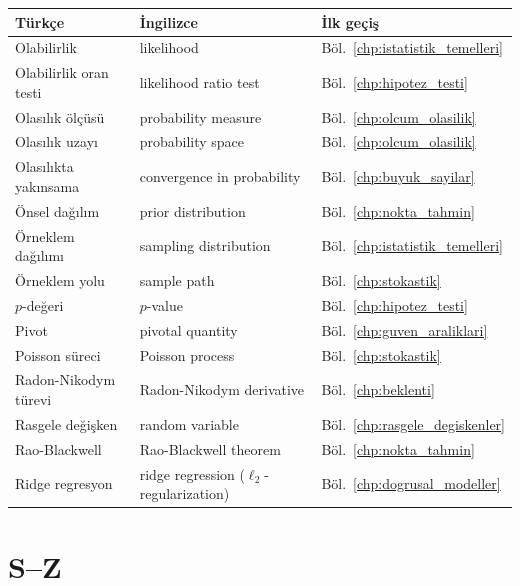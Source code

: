 \begin{tabular}{p{5cm}p{5cm}p{4cm}}
\hline
\textbf{Türkçe} & \textbf{İngilizce} & \textbf{İlk geçiş} \\
\hline
Olabilirlik & likelihood & Böl.~\ref{chp:istatistik_temelleri} \\
Olabilirlik oran testi & likelihood ratio test & Böl.~\ref{chp:hipotez_testi} \\
Olasılık ölçüsü & probability measure & Böl.~\ref{chp:olcum_olasilik} \\
Olasılık uzayı & probability space & Böl.~\ref{chp:olcum_olasilik} \\
Olasılıkta yakınsama & convergence in probability & Böl.~\ref{chp:buyuk_sayilar} \\
Önsel dağılım & prior distribution & Böl.~\ref{chp:nokta_tahmin} \\
Örneklem dağılımı & sampling distribution & Böl.~\ref{chp:istatistik_temelleri} \\
Örneklem yolu & sample path & Böl.~\ref{chp:stokastik} \\
$p$-değeri & $p$-value & Böl.~\ref{chp:hipotez_testi} \\
Pivot & pivotal quantity & Böl.~\ref{chp:guven_araliklari} \\
Poisson süreci & Poisson process & Böl.~\ref{chp:stokastik} \\
Radon-Nikodym türevi & Radon-Nikodym derivative & Böl.~\ref{chp:beklenti} \\
Rasgele değişken & random variable & Böl.~\ref{chp:rasgele_degiskenler} \\
Rao-Blackwell & Rao-Blackwell theorem & Böl.~\ref{chp:nokta_tahmin} \\
Ridge regresyon & ridge regression ($\ell_2$-regularization) & Böl.~\ref{chp:dogrusal_modeller} \\
\hline
\end{tabular}

\section{S--Z}

